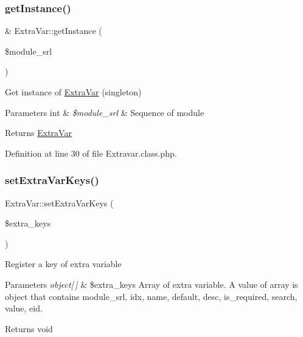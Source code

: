 \mbox{\label{classExtraVar_ad65adf9c2fc8c077dd2764b4faf2d8c4}} 
\subsubsection{\texorpdfstring{get\+Instance()}{getInstance()}}
{\footnotesize\ttfamily \& Extra\+Var\+::get\+Instance (\begin{DoxyParamCaption}\item[{}]{\$module\+\_\+srl }\end{DoxyParamCaption})}

Get instance of \hyperlink{classExtraVar}{Extra\+Var} (singleton)


\begin{DoxyParams}[1]{Parameters}
int & {\em \$module\+\_\+srl} & Sequence of module \\
\hline
\end{DoxyParams}
\begin{DoxyReturn}{Returns}
\hyperlink{classExtraVar}{Extra\+Var} 
\end{DoxyReturn}


Definition at line 30 of file Extravar.\+class.\+php.

\mbox{\label{classExtraVar_a8e5bb2ebfd6da9d82e78596b5e760e58}} 
\subsubsection{\texorpdfstring{set\+Extra\+Var\+Keys()}{setExtraVarKeys()}}
{\footnotesize\ttfamily Extra\+Var\+::set\+Extra\+Var\+Keys (\begin{DoxyParamCaption}\item[{}]{\$extra\+\_\+keys }\end{DoxyParamCaption})}

Register a key of extra variable


\begin{DoxyParams}{Parameters}
{\em object\mbox{[}$\,$\mbox{]}} & \$extra\+\_\+keys Array of extra variable. A value of array is object that contains module\+\_\+srl, idx, name, default, desc, is\+\_\+required, search, value, eid. \\
\hline
\end{DoxyParams}
\begin{DoxyReturn}{Returns}
void 
\end{DoxyReturn}


